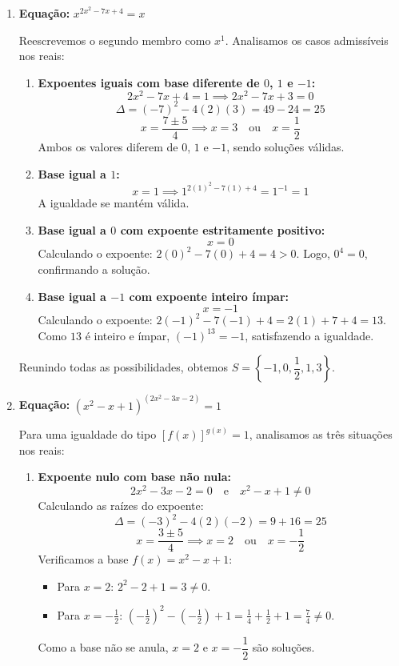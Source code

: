 \documentclass[12pt,a4paper]{report}
\begin{document}
\begin{enumerate}[label=\textbf{\arabic*.}]
	\vspace{0.5cm}
	
	\item \textbf{Equação:} $x^{2x^2-7x+4} = x$
	
	Reescrevemos o segundo membro como $x^1$. Analisamos os casos admissíveis nos reais:
	\begin{enumerate}[label=\alph*)]
		\item \textbf{Expoentes iguais com base diferente de $0$, $1$ e $-1$:}
		\[
		2x^2 - 7x + 4 = 1 \implies 2x^2 - 7x + 3 = 0
		\]
		\[
		\Delta = (-7)^2 - 4(2)(3) = 49 - 24 = 25
		\]
		\[
		x = \frac{7 \pm 5}{4} \implies x = 3 \quad \text{ou} \quad x = \frac{1}{2}
		\]
		Ambos os valores diferem de $0$, $1$ e $-1$, sendo soluções válidas.
		
		\item \textbf{Base igual a $1$:}
		\[
		x = 1 \implies 1^{2(1)^2 - 7(1) + 4} = 1^{-1} = 1
		\]
		A igualdade se mantém válida.
		
		\item \textbf{Base igual a $0$ com expoente estritamente positivo:}
		\[
		x = 0
		\]
		Calculando o expoente: $2(0)^2 - 7(0) + 4 = 4 > 0$. Logo, $0^4 = 0$, confirmando a solução.
		
		\item \textbf{Base igual a $-1$ com expoente inteiro ímpar:}
		\[
		x = -1
		\]
		Calculando o expoente: $2(-1)^2 - 7(-1) + 4 = 2(1) + 7 + 4 = 13$. Como $13$ é inteiro e ímpar, $(-1)^{13} = -1$, satisfazendo a igualdade.
	\end{enumerate}
	Reunindo todas as possibilidades, obtemos $S = \left\{ -1, 0, \dfrac{1}{2}, 1, 3 \right\}$.
	
	\vspace{0.5cm}
	
	\item \textbf{Equação:} $(x^2 - x + 1)^{(2x^2 - 3x - 2)} = 1$
	
	Para uma igualdade do tipo $[f(x)]^{g(x)} = 1$, analisamos as três situações nos reais:
	\begin{enumerate}[label=\alph*)]
		\item \textbf{Expoente nulo com base não nula:}
		\[
		2x^2 - 3x - 2 = 0 \quad \text{e} \quad x^2 - x + 1 \neq 0
		\]
		Calculando as raízes do expoente:
		\[
		\Delta = (-3)^2 - 4(2)(-2) = 9 + 16 = 25
		\]
		\[
		x = \frac{3 \pm 5}{4} \implies x = 2 \quad \text{ou} \quad x = -\frac{1}{2}
		\]
		Verificamos a base $f(x) = x^2 - x + 1$:
		\begin{itemize}
			\item Para $x = 2$: $2^2 - 2 + 1 = 3 \neq 0$.
			\item Para $x = -\frac{1}{2}$: $\left(-\frac{1}{2}\right)^2 - \left(-\frac{1}{2}\right) + 1 = \frac{1}{4} + \frac{1}{2} + 1 = \frac{7}{4} \neq 0$.
		\end{itemize}
		Como a base não se anula, $x = 2$ e $x = -\dfrac{1}{2}$ são soluções.
		

\end{enumerate}
\end{enumerate}
\end{document}
